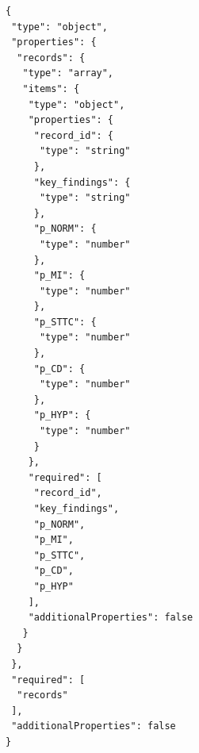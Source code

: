 \begin{small}
\begin{verbatim}
{
 "type": "object",
 "properties": {
  "records": {
   "type": "array",
   "items": {
    "type": "object",
    "properties": {
     "record_id": {
      "type": "string"
     },
     "key_findings": {
      "type": "string"
     },
     "p_NORM": {
      "type": "number"
     },
     "p_MI": {
      "type": "number"
     },
     "p_STTC": {
      "type": "number"
     },
     "p_CD": {
      "type": "number"
     },
     "p_HYP": {
      "type": "number"
     }
    },
    "required": [
     "record_id",
     "key_findings",
     "p_NORM",
     "p_MI",
     "p_STTC",
     "p_CD",
     "p_HYP"
    ],
    "additionalProperties": false
   }
  }
 },
 "required": [
  "records"
 ],
 "additionalProperties": false
}
\end{verbatim}
\end{small}
